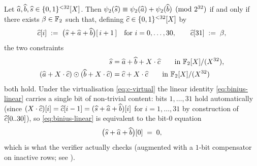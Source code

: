 \begin{lemma}
\label{lem:binius-vc}
Let $\widehat{a}, \widehat{b}, \widehat{s} \in \{0,1\}^{<32}[X]$. Then
$\psi_2(\widehat{s}) \equiv \psi_2(\widehat{a}) + \psi_2(\widehat{b}) \pmod{2^{32}}$
if and only if there exists $\beta \in \mathbb{F}_2$ such that, defining
$\widehat{c} \in \{0,1\}^{<32}[X]$ by
\begin{equation}\label{eq:c-virtual}
\widehat{c}[i] \;:=\; \bigl(\widehat{s} + \widehat{a} + \widehat{b}\bigr)[\,i+1\,]
\quad \text{for } i = 0,\dots,30, \qquad
\widehat{c}[31] \;:=\; \beta,
\end{equation}
the two constraints
\begin{align}
\widehat{s} &= \widehat{a} + \widehat{b} + X\cdot\widehat{c} \qquad \text{in } \mathbb{F}_2[X]/(X^{32}), \label{eq:binius-linear}\\
(\widehat{a} + X\cdot\widehat{c}) \odot (\widehat{b} + X\cdot\widehat{c})
   &= \widehat{c} + X\cdot\widehat{c} \qquad \text{in } \mathbb{F}_2[X]/(X^{32}) \label{eq:binius-had}
\end{align}
both hold. Under the virtualisation \eqref{eq:c-virtual} the linear
identity \eqref{eq:binius-linear} carries a single bit of non-trivial
content: bits $1, \dots, 31$ hold automatically (since
$(X\cdot\widehat{c})[i] = \widehat{c}[i-1] = (\widehat{s} + \widehat{a} + \widehat{b})[i]$ for
$i = 1,\dots,31$ by construction of $\widehat{c}[0..30]$), so
\eqref{eq:binius-linear} is equivalent to the bit-$0$ equation
\begin{equation}\label{eq:binius-lsb}
\bigl(\widehat{s} + \widehat{a} + \widehat{b}\bigr)[0] \;=\; 0,
\end{equation}
which is what the verifier actually checks (augmented with a $1$-bit
compensator on inactive rows; see ).
\end{lemma}

